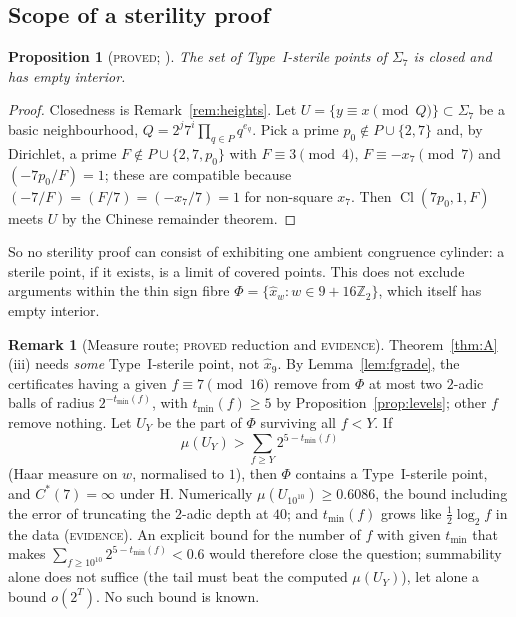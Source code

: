 \documentclass[11pt,reqno]{amsart}
\newtheorem{proposition}[theorem]{Proposition}
\theoremstyle{definition}
\newtheorem{remark}[theorem]{Remark}
\newcommand{\Z}{\mathbb Z}
\newcommand{\Cl}{\operatorname{Cl}}
\newcommand{\status}[1]{\textup{\textsc{#1}}}
\begin{document}
\subsection{Scope of a sterility proof}

\begin{proposition}[\status{proved}; {\cite[Prop.~3.1]{PT3}}]\label{prop:nowhere}
The set of Type~I-sterile points of $\Sigma_7$ is closed and has empty
interior.
\end{proposition}

\begin{proof}
Closedness is Remark~\ref{rem:heights}.  Let $U=\{y\equiv
x\pmod Q\}\subset\Sigma_7$ be a basic neighbourhood, $Q=2^j7^i\prod_{q\in
P}q^{e_q}$.  Pick a prime $p_0\notin P\cup\{2,7\}$ and, by Dirichlet, a
prime $F\notin P\cup\{2,7,p_0\}$ with $F\equiv3\pmod4$,
$F\equiv-x_7\pmod7$ and $(-7p_0/F)=1$; these are compatible because
$(-7/F)=(F/7)=(-x_7/7)=1$ for non-square $x_7$.  Then $\Cl(7p_0,1,F)$
meets $U$ by the Chinese remainder theorem.
\end{proof}

So no sterility proof can consist of exhibiting one ambient congruence
cylinder: a sterile point, if it exists, is a limit of covered points.
This does not exclude arguments within the thin sign fibre
$\Phi=\{\hat x_w: w\in9+16\Z_2\}$, which itself has empty interior.

\begin{remark}[Measure route; \status{proved} reduction and
\status{evidence}]\label{rem:measure}
Theorem~\ref{thm:A}(iii) needs \emph{some} Type~I-sterile point, not
$\hat x_9$.  By Lemma~\ref{lem:fgrade}, the certificates having a given
$f\equiv7\pmod{16}$ remove from $\Phi$ at most two $2$-adic balls of
radius $2^{-t_{\min}(f)}$, with $t_{\min}(f)\ge5$ by
Proposition~\ref{prop:levels}; other $f$ remove nothing.  Let $U_Y$ be the
part of $\Phi$ surviving all $f<Y$.  If
\[
\mu(U_Y)>\sum_{f\ge Y}2^{5-t_{\min}(f)}
\]
(Haar measure on $w$, normalised to $1$), then $\Phi$ contains a
Type~I-sterile point, and $C^*(7)=\infty$ under H.  Numerically
$\mu(U_{10^{10}})\ge0.6086$, the bound including the error of truncating
the $2$-adic depth at $40$; and $t_{\min}(f)$ grows like
$\tfrac12\log_2f$ in the data (\status{evidence}).  An explicit bound
for the number of $f$ with given $t_{\min}$ that makes
$\sum_{f\ge10^{10}}2^{5-t_{\min}(f)}<0.6$ would therefore close the
question; summability alone does not suffice (the tail must beat the
computed $\mu(U_Y)$), let alone a bound $o(2^T)$.  No such bound is
known.
\end{remark}
\end{document}

